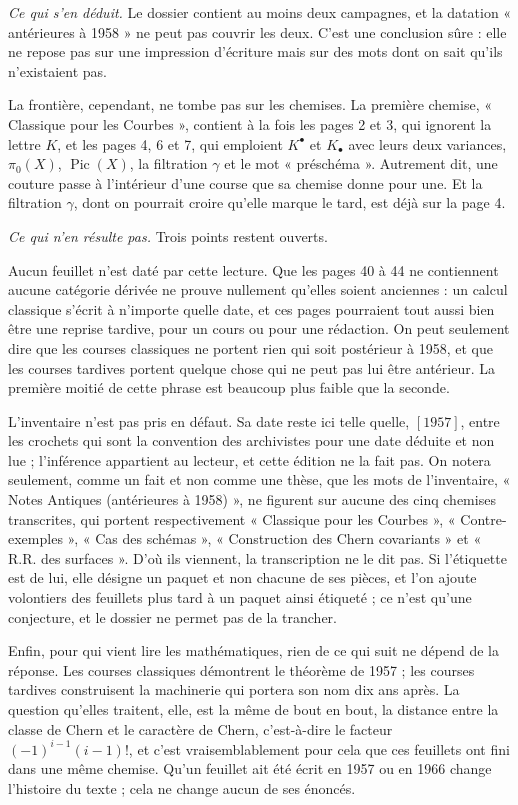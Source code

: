 \documentclass[11pt,a4paper]{article}
\begin{document}
\emph{Ce qui s'en déduit.} Le dossier contient au moins deux campagnes, et la
datation « antérieures à 1958 » ne peut pas couvrir les deux. C'est une
conclusion sûre : elle ne repose pas sur une impression d'écriture mais sur des
mots dont on sait qu'ils n'existaient pas.

La frontière, cependant, ne tombe pas sur les chemises. La première chemise, « Classique
pour les Courbes », contient à la fois les pages 2 et 3, qui ignorent la lettre
$K$, et les pages 4, 6 et 7, qui emploient $K^{\bullet}$ et $K_{\bullet}$ avec
leurs deux variances, $\pi_{0}(X)$, $\operatorname{Pic}(X)$, la filtration
$\gamma$ et le mot « préschéma ». Autrement dit, une couture passe à
l'intérieur d'une course que sa chemise donne pour une. Et la filtration
$\gamma$, dont on pourrait croire qu'elle marque le tard, est déjà sur la page
4.

\emph{Ce qui n'en résulte pas.} Trois points restent ouverts.

Aucun feuillet n'est daté par cette lecture. Que les pages 40 à 44 ne
contiennent aucune catégorie dérivée ne prouve nullement qu'elles soient
anciennes : un calcul classique s'écrit à n'importe quelle date, et ces pages
pourraient tout aussi bien être une reprise tardive, pour un cours ou pour une
rédaction. On peut seulement dire que les courses classiques
ne portent rien qui soit postérieur à 1958, et que les courses tardives portent
quelque chose qui ne peut pas lui être antérieur. La première moitié de cette
phrase est beaucoup plus faible que la seconde.

L'inventaire n'est pas pris en défaut. Sa date reste ici telle quelle,
$[1957]$, entre les crochets qui sont la convention des archivistes pour une
date déduite et non lue ; l'inférence appartient au lecteur, et cette édition
ne la fait pas. On notera seulement, comme un fait et non comme une thèse, que
les mots de l'inventaire, « Notes Antiques (antérieures à 1958) », ne
figurent sur aucune des cinq chemises transcrites, qui portent respectivement
« Classique pour les Courbes », « Contre-exemples », « Cas des schémas »,
« Construction des Chern covariants » et « R.R. des surfaces ». D'où ils
viennent, la transcription ne le dit pas. Si l'étiquette est de lui, elle
désigne un paquet et non chacune de ses pièces, et l'on ajoute volontiers des
feuillets plus tard à un paquet ainsi étiqueté ; ce n'est qu'une conjecture,
et le dossier ne permet pas de la trancher.

Enfin, pour qui vient lire les mathématiques, rien de ce qui suit ne dépend de
la réponse. Les courses classiques démontrent
le théorème de 1957 ; les courses tardives construisent la machinerie qui
portera son nom dix ans après. La question qu'elles traitent, elle, est la même
de bout en bout, la distance entre la classe de Chern et le caractère de
Chern, c'est-à-dire le facteur $(-1)^{i-1}(i-1)!$, et c'est vraisemblablement
pour cela que ces feuillets ont fini dans une même chemise. Qu'un feuillet ait
été écrit en 1957 ou en 1966 change l'histoire du texte ; cela ne change aucun
de ses énoncés.
\end{document}
